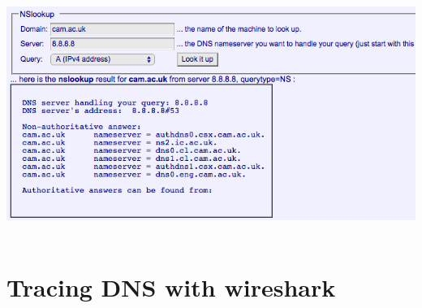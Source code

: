 \documentclass[a4paper]{article}
\begin{document}
{	{\centering\includegraphics[scale=0.5]{Illustrations/3.png}}\\\\
 }
\section*{ Tracing DNS with wireshark}
\end{document}
